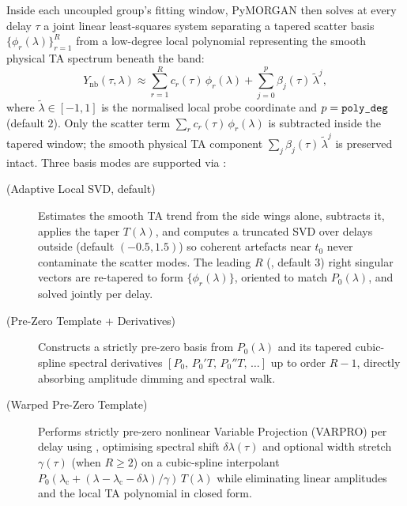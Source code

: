 Inside each uncoupled group's fitting window, PyMORGAN then solves at every delay
$\tau$ a joint linear least-squares system separating a tapered scatter basis
$\{\phi_r(\lambda)\}_{r=1}^{R}$ from a low-degree local polynomial representing
the smooth physical TA spectrum beneath the band:
\begin{equation}
  Y_{\mathrm{nb}}(\tau, \lambda) \approx \sum_{r=1}^{R} c_r(\tau)\,\phi_r(\lambda) + \sum_{j=0}^{p} \beta_j(\tau)\,\tilde{\lambda}^j,
\end{equation}
where $\tilde{\lambda} \in [-1, 1]$ is the normalised local probe coordinate and
$p = \texttt{poly\_deg}$ (default $2$). Only the scatter term
$\sum_r c_r(\tau)\,\phi_r(\lambda)$ is subtracted inside the tapered window;
the smooth physical TA component $\sum_j \beta_j(\tau)\,\tilde{\lambda}^j$ is
preserved intact. Three basis modes are supported via :
\begin{description}
  \item[ (Adaptive Local SVD, default)] Estimates the smooth
        TA trend from the side wings alone, subtracts it, applies the taper
        $T(\lambda)$, and computes a truncated SVD over delays outside
         (default $(-0.5, 1.5)$) so coherent artefacts near
        $t_0$ never contaminate the scatter modes. The leading $R$ (,
        default $3$) right singular vectors are re-tapered to form
        $\{\phi_r(\lambda)\}$, oriented to match $P_0(\lambda)$, and solved
        jointly per delay.
  \item[ (Pre-Zero Template + Derivatives)] Constructs a strictly
        pre-zero basis from $P_0(\lambda)$ and its tapered cubic-spline
        spectral derivatives $[P_0,\, P_0'T,\, P_0''T,\, \dots]$ up to order
        $R-1$, directly absorbing amplitude dimming and spectral walk.
  \item[ (Warped Pre-Zero Template)] Performs strictly pre-zero
        nonlinear Variable Projection (VARPRO) per delay using
        , optimising spectral shift
        $\delta\lambda(\tau)$ and optional width stretch $\gamma(\tau)$ (when
        $R \ge 2$) on a cubic-spline interpolant
        $P_0(\lambda_{\mathrm{c}} + (\lambda - \lambda_{\mathrm{c}} - \delta\lambda)/\gamma)\,T(\lambda)$
        while eliminating linear amplitudes and the local TA polynomial in
        closed form.
\end{description}

